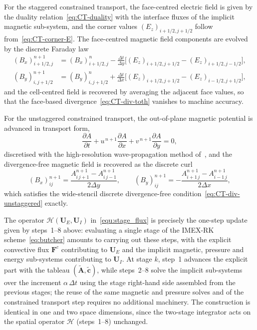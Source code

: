 \documentclass[a4paper,fleqn]{cas-sc}
\theoremstyle{definition}
\theoremstyle{remark}
\begin{document}
\begin{enumerate}
For the staggered constrained transport, the face-centred electric field is given by the
duality relation~\eqref{eq:CT-duality} with the interface fluxes of the implicit magnetic
sub-system, and the corner values $(E_z)_{i+1/2,j+1/2}$ follow from~\eqref{eq:CT-corner-E}.
The face-centred magnetic field components are evolved by the discrete Faraday law
\begin{equation}
\begin{aligned}
(B_x)^{n+1}_{i+1/2,j} &= (B_x)^{n}_{i+1/2,j}
 - \frac{\Delta t}{\Delta y}\Big[(E_z)_{i+1/2,j+1/2}-(E_z)_{i+1/2,j-1/2}\Big],\\
(B_y)^{n+1}_{i,j+1/2} &= (B_y)^{n}_{i,j+1/2}
 + \frac{\Delta t}{\Delta x}\Big[(E_z)_{i+1/2,j+1/2}-(E_z)_{i-1/2,j+1/2}\Big],
\end{aligned}
\end{equation}
and the cell-centred field is recovered by averaging the adjacent face values, so that
the face-based divergence~\eqref{eq:CT-div-toth} vanishes to machine accuracy.

For the unstaggered constrained transport, the out-of-plane magnetic potential is
advanced in transport form,
\begin{equation}
\label{eq:A_transport_step}
\frac{\partial A}{\partial t}
 + u^{\,n+1}\frac{\partial A}{\partial x}
 + v^{\,n+1}\frac{\partial A}{\partial y} = 0 ,
\end{equation}
discretised with the high-resolution wave-propagation method
of~\cite{leVeque2002,Rossmanith2006}, and the divergence-free magnetic field is
recovered as the discrete curl
\begin{equation}
(B_x)^{n+1}_{ij}=\frac{A^{n+1}_{i\,j+1}-A^{n+1}_{i\,j-1}}{2\Delta y},
\qquad
(B_y)^{n+1}_{ij}=-\frac{A^{n+1}_{i+1\,j}-A^{n+1}_{i-1\,j}}{2\Delta x},
\end{equation}
which satisfies the wide-stencil discrete divergence-free
condition~\eqref{eq:CT-div-unstaggered} exactly.


\end{enumerate}
The operator $\mathcal{H}(\mathbf{U}_E,\mathbf{U}_I)$ in~\eqref{equ:stage_flux}
is precisely the one-step update given by steps~1--8 above: evaluating a single stage of
the IMEX-RK scheme~\eqref{eq:butcher} amounts to carrying out these steps, with the
explicit convective flux $\mathbf{F}^c$ contributing to $\mathbf{U}_E$ and the implicit
magnetic, pressure and energy sub-systems contributing to $\mathbf{U}_I$. At stage $k$,
step~1 advances the explicit part with the tableau
$(\tilde{\mathbf{A}},\tilde{\mathbf{c}})$, while steps~2--8 solve the implicit
sub-systems over the increment $\alpha\,\Delta t$ using the stage right-hand side
assembled from the previous stages; the reuse of the same magnetic and pressure solves
and of the constrained transport step requires no additional machinery. The
construction is identical in one and two space dimensions, since the two-stage
integrator acts on the spatial operator $\mathcal{H}$ (steps~1--8) unchanged.
\end{document}
